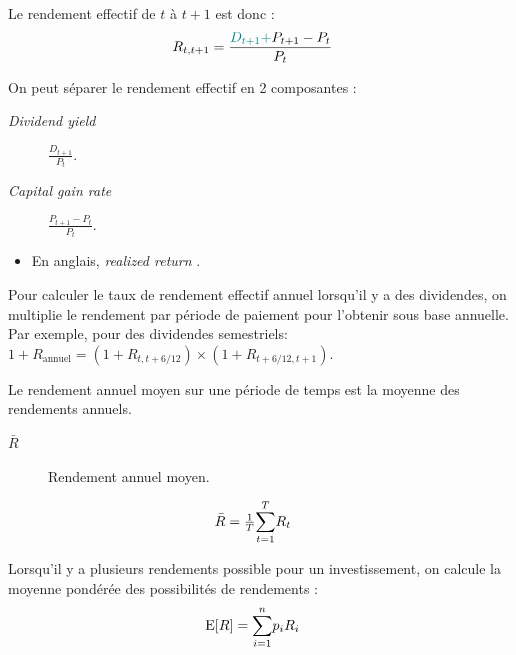 \documentclass[10pt, french]{article}
\begin{document}
\begin{multicols*}{2}
\begin{definitionNOHFILL}
Le rendement effectif de $t$ à $t + 1$ est donc :
\begin{align*}
R_{t, t + 1}
	&=	\frac{{\color{teal}D_{t + 1} + }P_{t + 1} - P_{t}}{P_{t}}
\end{align*}

On peut séparer le rendement effectif en 2 composantes :
\begin{description}
	\item[\og \textit{Dividend yield} \fg{}]	$\tfrac{D_{t + 1}}{P_{t}}$.
	\item[\og \textit{Capital gain rate} \fg{}]	$\tfrac{P_{t + 1} - P_{t}}{P_{t}}$.
\end{description}

\tcbline

\begin{itemize}
	\item	En anglais, \og \textit{realized return} \fg{}.
\end{itemize}


\begin{definitionNOHFILLsub}
Pour calculer le taux de rendement effectif annuel lorsqu'il y a des dividendes, on multiplie le rendement par période de paiement pour l'obtenir sous base annuelle.	\\

Par exemple, pour des dividendes semestriels: $1 + R_{\text{annuel}}	=	(1 + R_{t, t + 6/12}) \times (1 + R_{t + 6/12, t + 1})$.
\end{definitionNOHFILLsub}

\begin{definitionNOHFILLsub}
Le rendement annuel moyen sur une période de temps est la moyenne des rendements annuels.

\begin{distributions}[Notation]
\begin{description}
	\item[$\bar{R}$]	Rendement annuel moyen.
\end{description}
\end{distributions}

\begin{align*}
	\bar{R}
	&=	\tfrac{1}{T} \overset{T}{\underset{t	=	1}{\sum}}R_{t}
\end{align*}
\end{definitionNOHFILLsub}
\end{definitionNOHFILL}

\begin{definitionNOHFILL}
Lorsqu'il y a plusieurs rendements possible pour un investissement, on calcule la moyenne pondérée des possibilités de rendements : 
\begin{align*}
	\text{E}[R]
	&=	\overset{n}{\underset{i	=	1}{\sum}} p_{i}R_{i}
\end{align*}
\end{definitionNOHFILL}


\end{multicols*}
\end{document}
